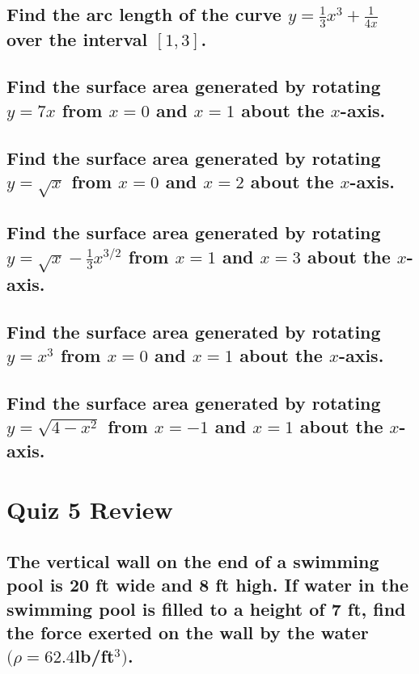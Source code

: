 \documentclass{article}
\begin{document}
\subsection{Find the arc length of the curve $y = \frac{1}{3}x^3 + \frac{1}{4x}$ over the interval $[1, 3]$.}

\subsection{Find the surface area generated by rotating $y = 7x$ from $x = 0$ and $x = 1$ about the $x$-axis.}

\subsection{Find the surface area generated by rotating $y = \sqrt{x}$ from $x = 0$ and $x = 2$ about the $x$-axis.}

\subsection{Find the surface area generated by rotating $y = \sqrt{x} - \frac{1}{3}x^{3/2}$ from $x = 1$ and $x = 3$ about the $x$-axis.}

\subsection{Find the surface area generated by rotating $y = x^3$ from $x = 0$ and $x = 1$ about the $x$-axis.}

\subsection{Find the surface area generated by rotating $y = \sqrt{4 - x^2}$ from $x = -1$ and $x = 1$ about the $x$-axis.}









\newpage
\section{Quiz 5 Review}
\subsection{The vertical wall on the end of a swimming pool is 20 ft wide and 8 ft high. If water in the swimming pool is filled to a height of 7 ft, find the force exerted on the wall by the water $(\rho = 62.4 $lb/ft$^3)$.}
\end{document}
